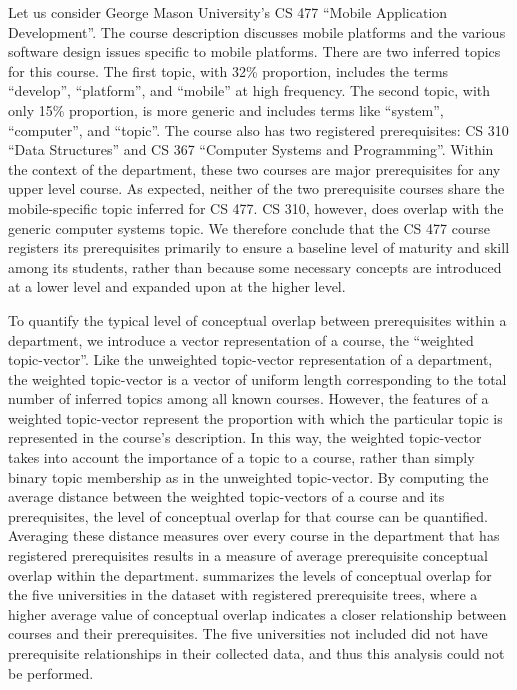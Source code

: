 
Let us consider George Mason University's CS 477 ``Mobile Application Development''.
The course description discusses mobile platforms and the various software design issues specific to mobile platforms.
There are two inferred topics for this course.
The first topic, with 32\% proportion, includes the terms ``develop'', ``platform'', and ``mobile'' at high frequency.
The second topic, with only 15\% proportion, is more generic and includes terms like ``system'', ``computer'', and ``topic''.
The course also has two registered prerequisites: CS 310 ``Data Structures'' and CS 367 ``Computer Systems and Programming''.
Within the context of the department, these two courses are major prerequisites for any upper level course.
As expected, neither of the two prerequisite courses share the mobile-specific topic inferred for CS 477.
CS 310, however, does overlap with the generic computer systems topic.
We therefore conclude that the CS 477 course registers its prerequisites primarily to ensure a baseline level of maturity and skill among its students, rather than because some necessary concepts are introduced at a lower level and expanded upon at the higher level.


To quantify the typical level of conceptual overlap between prerequisites within a department, we introduce a vector representation of a course, the ``weighted topic-vector''.
Like the unweighted topic-vector representation of a department, the weighted topic-vector is a vector of uniform length corresponding to the total number of inferred topics among all known courses.
However, the features of a weighted topic-vector represent the proportion with which the particular topic is represented in the course's description.
In this way, the weighted topic-vector takes into account the importance of a topic to a course, rather than simply binary topic membership as in the unweighted topic-vector.
By computing the average distance between the weighted topic-vectors of a course and its prerequisites, the level of conceptual overlap for that course can be quantified.
Averaging these distance measures over every course in the department that has registered prerequisites results in a measure of average prerequisite conceptual overlap within the department.
 summarizes the levels of conceptual overlap for the five universities in the dataset with registered prerequisite trees, where a higher average value of conceptual overlap indicates a closer relationship between courses and their prerequisites.
The five universities not included did not have prerequisite relationships in their collected data, and thus this analysis could not be performed.

